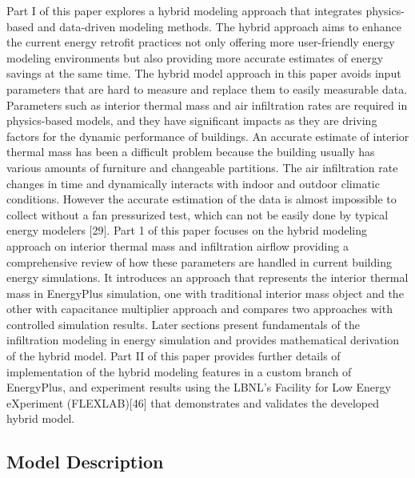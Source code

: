 Part I of this paper explores a hybrid modeling approach that integrates physics-based and data-driven modeling methods. The hybrid approach aims to enhance the current energy retrofit practices not only offering more user-friendly energy modeling environments but also providing more accurate estimates of energy savings at the same time. The hybrid model approach in this paper avoids input parameters that are hard to measure and replace them to easily measurable data. Parameters such as interior thermal mass and air infiltration rates are required in physics-based models, and they have significant impacts as they are driving factors for the dynamic performance of buildings. An accurate estimate of interior thermal mass has been a difficult problem because the building usually has various amounts of furniture and changeable partitions. The air infiltration rate changes in time and dynamically interacts with indoor and outdoor climatic conditions. However the accurate estimation of the data is almost impossible to collect without a fan pressurized test, which can not be easily done by typical energy modelers [29]. Part 1 of this paper focuses on the hybrid modeling approach on interior thermal mass and infiltration airflow providing a comprehensive review of how these parameters are handled in current building energy simulations. It introduces an approach that represents the interior thermal mass in EnergyPlus simulation, one with traditional interior mass object and the other with capacitance multiplier approach and compares two approaches with controlled simulation results. Later sections present fundamentals of the infiltration modeling in energy simulation and provides mathematical derivation of the hybrid model. Part II of this paper provides further details of implementation of the hybrid modeling features in a custom branch of EnergyPlus, and experiment results using the LBNL's  Facility for Low Energy eXperiment (FLEXLAB)[46] that demonstrates and validates the developed hybrid model.

\subsection{Model Description}\label{model-description-001}

